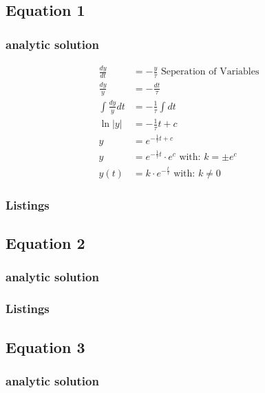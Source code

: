 \subsection{Equation 1}
\subsubsection{analytic solution}
\begin{align}
    \frac{dy}{dt}&=-\frac{y}{\tau} \text{  Seperation of Variables}\\
    \frac{dy}{y}&=-\frac{dt}{\tau} \\
    \int\frac{dy}{y} dt&=-\frac{1}{\tau} \int dt \\
    \ln{|y|}&=-\frac{1}{\tau}t+c \\
    y&=e^{-\frac{1}{\tau}t+c} \\
    y&=e^{-\frac{1}{\tau}t}\cdot e^{c} \text{ with: } k=\pm e^c\\
    y(t)&=k\cdot e^{-\frac{t}{\tau}}\text{ with: } k\neq0
\end{align}

\subsubsection{Listings}


\subsection{Equation 2}
\subsubsection{analytic solution}

\subsubsection{Listings}


\subsection{Equation 3}
\subsubsection{analytic solution}

